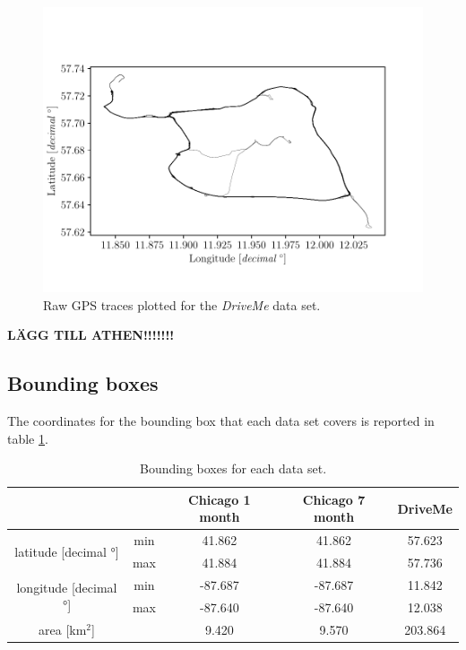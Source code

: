\begin{figure}[H]
    \centering
    \includegraphics[width=\linewidth]{Figures/Data/raw_data_drive_me.pdf}
    \caption{Raw GPS traces plotted for the \textit{DriveMe} data set.}
    \label{fig:data/dm}
\end{figure}


\textbf{LÄGG TILL ATHEN!!!!!!!}


\newpage
\subsection{Bounding boxes}

The coordinates for the bounding box that each data set covers is reported in table \ref{tab:data/bbox}.

\begin{table}[H]
\centering
\caption{Bounding boxes for each data set.}
\label{tab:data/bbox}
\begin{tabular}{ccccc}
                           &     & Chicago 1 month & Chicago 7 month & DriveMe   \\ \hline
\multirow{2}{*}{latitude [decimal °]}  & min & 41.862  & 41.862  & 57.623 \\
                           & max & 41.884  & 41.884  & 57.736 \\
\multirow{2}{*}{longitude [decimal °]} & min & -87.687 & -87.687 & 11.842 \\
                           & max & -87.640 & -87.640 & 12.038 \\
area [km$^2$] & &  9.420 & 9.570 & 203.864                           \\ \hline
\end{tabular}
\end{table}

